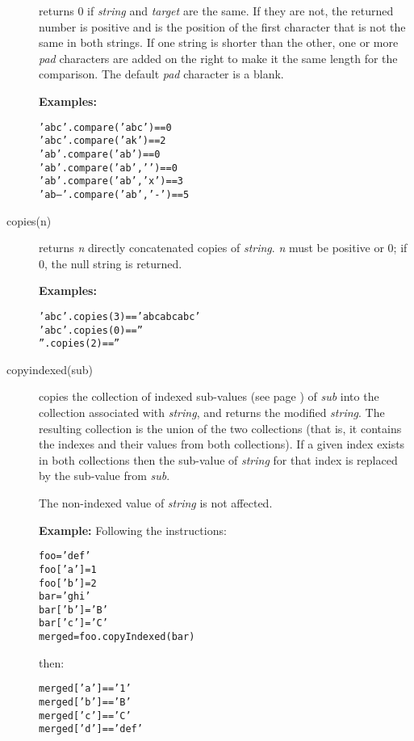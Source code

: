 \begin{description}
returns 0 if \emph{string} and \emph{target}
are the same.
If they are not, the returned number is positive and is the position of
the first character that is not the same in both strings.
If one string is shorter than the other, one or more \emph{pad}
characters are added on the right to make it the same length for the
comparison.
The default \emph{pad} character is a blank.
 
\textbf{Examples:}
\begin{alltt}
'abc'.compare('abc')      == 0
'abc'.compare('ak')       == 2
'ab '.compare('ab')       == 0
'ab '.compare('ab',' ')   == 0
'ab '.compare('ab','x')   == 3
'ab-- '.compare('ab','-') == 5
\end{alltt}
\item[copies(n)]\label{refcopies}
returns \emph{n} directly concatenated copies of
\emph{string}.
\emph{n} must be positive or 0; if 0, the null string is returned.
 
\textbf{Examples:}
\begin{alltt}
'abc'.copies(3) == 'abcabcabc'
'abc'.copies(0) == ''
''.copies(2)    == ''
\end{alltt}
\item[copyindexed(sub)]\label{refcopyind}
copies the collection of indexed  sub-values (see page \pageref{refinstr}) 
of \emph{sub} into the collection associated with
\emph{string}, and returns the modified \emph{string}.  The
resulting collection is the union of the two collections (that is,
it contains the indexes and their values from both collections).
If a given index exists in both collections then the sub-value of
\emph{string} for that index is replaced by the sub-value from
\emph{sub}.
 
The non-indexed value of \emph{string} is not affected.
 
\textbf{Example:}
 Following the instructions:
\begin{alltt}
foo='def'
foo['a']=1
foo['b']=2
bar='ghi'
bar['b']='B'
bar['c']='C'
merged=foo.copyIndexed(bar)
\end{alltt}
then:
\begin{alltt}
merged['a'] == '1'
merged['b'] == 'B'
merged['c'] == 'C'
merged['d'] == 'def'
\end{alltt}



\end{description}
